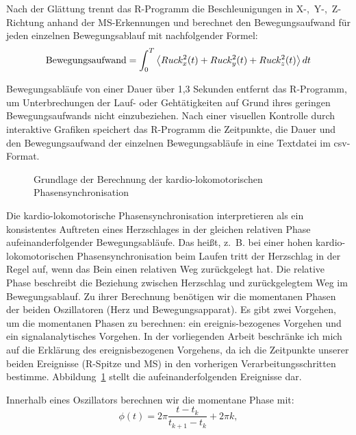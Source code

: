 \newpage

Nach der Glättung trennt das R-Programm die Beschleunigungen in \mbox{X-, Y-, Z-Richtung} anhand der \ac{MS}-Erkennungen und berechnet den Bewegungsaufwand für jeden einzelnen Bewegungsablauf mit nachfolgender Formel: 
\begin{equation}
	\textnormal{Bewegungsaufwand} = \int^T_0 \left\langle {Ruck^2_{x}(t) + Ruck^2_{y}(t) + Ruck^2_{z}(t)}\right\rangle dt 
\end{equation}

Bewegungsabläufe von einer Dauer über 1,3 Sekunden entfernt das R-Programm, um Unterbrechungen der Lauf- oder Gehtätigkeiten auf Grund ihres geringen Bewegungsaufwands nicht einzubeziehen. Nach einer visuellen Kontrolle durch interaktive Grafiken speichert das R-Programm die Zeitpunkte, die Dauer und den Bewegungsaufwand der einzelnen Bewegungsabläufe in eine Textdatei im \acs{csv}-Format. 
\begin{figure}
	[!htb]  \caption[Grundlage der Berechnung der kardio-lokomotorischen Phasensynchronisation]{Grundlage der Berechnung der kardio-lokomotorischen Phasensynchronisation} \label{fig:grundlage_klps} 
\end{figure}

Die kardio-lokomotorische Phasensynchronisation interpretieren \citet[][S.~12]{Niizeki2014} als ein konsistentes Auftreten eines Herzschlages in der gleichen relativen Phase aufeinanderfolgender Bewegungsabläufe. Das heißt, z.~B. bei einer hohen kardio-lokomotorischen Phasensynchronisation beim Laufen tritt der Herzschlag in der Regel auf, wenn das Bein einen relativen Weg zurückgelegt hat. Die relative Phase beschreibt die Beziehung zwischen Herzschlag und zurückgelegtem Weg im Bewegungsablauf. Zu ihrer Berechnung benötigen wir die momentanen Phasen der beiden Oszillatoren (Herz und Bewegungsapparat). Es gibt zwei Vorgehen, um die momentanen Phasen zu berechnen: ein ereignis-bezogenes Vorgehen und ein signalanalytisches Vorgehen. In der vorliegenden Arbeit beschränke ich mich auf die Erklärung des ereignisbezogenen Vorgehens, da ich die Zeitpunkte unserer beiden Ereignisse (R-Spitze und \ac{MS}) in den vorherigen Verarbeitungsschritten bestimme. Abbildung~\ref{fig:grundlage_klps} stellt die aufeinanderfolgenden Ereignisse dar.

\newpage

Innerhalb eines Oszillators berechnen wir die momentane Phase mit: 
\begin{equation}
	\phi(t) = 2 \pi \frac{t-t_{k}}{t_{k+1}-t_{k}} + 2 \pi k, 
\end{equation}

